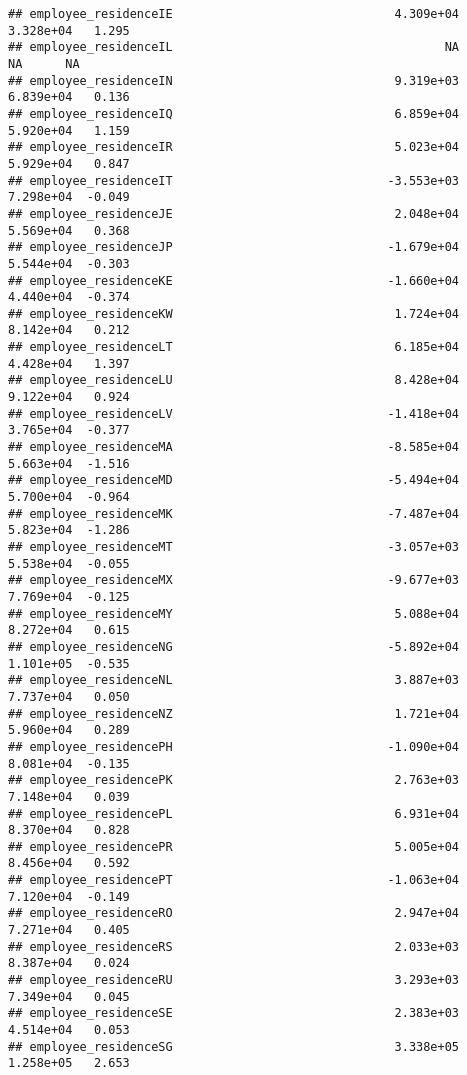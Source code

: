 \documentclass[
]{article}
\begin{document}
\begin{verbatim}
## employee_residenceIE                               4.309e+04  3.328e+04   1.295
## employee_residenceIL                                      NA         NA      NA
## employee_residenceIN                               9.319e+03  6.839e+04   0.136
## employee_residenceIQ                               6.859e+04  5.920e+04   1.159
## employee_residenceIR                               5.023e+04  5.929e+04   0.847
## employee_residenceIT                              -3.553e+03  7.298e+04  -0.049
## employee_residenceJE                               2.048e+04  5.569e+04   0.368
## employee_residenceJP                              -1.679e+04  5.544e+04  -0.303
## employee_residenceKE                              -1.660e+04  4.440e+04  -0.374
## employee_residenceKW                               1.724e+04  8.142e+04   0.212
## employee_residenceLT                               6.185e+04  4.428e+04   1.397
## employee_residenceLU                               8.428e+04  9.122e+04   0.924
## employee_residenceLV                              -1.418e+04  3.765e+04  -0.377
## employee_residenceMA                              -8.585e+04  5.663e+04  -1.516
## employee_residenceMD                              -5.494e+04  5.700e+04  -0.964
## employee_residenceMK                              -7.487e+04  5.823e+04  -1.286
## employee_residenceMT                              -3.057e+03  5.538e+04  -0.055
## employee_residenceMX                              -9.677e+03  7.769e+04  -0.125
## employee_residenceMY                               5.088e+04  8.272e+04   0.615
## employee_residenceNG                              -5.892e+04  1.101e+05  -0.535
## employee_residenceNL                               3.887e+03  7.737e+04   0.050
## employee_residenceNZ                               1.721e+04  5.960e+04   0.289
## employee_residencePH                              -1.090e+04  8.081e+04  -0.135
## employee_residencePK                               2.763e+03  7.148e+04   0.039
## employee_residencePL                               6.931e+04  8.370e+04   0.828
## employee_residencePR                               5.005e+04  8.456e+04   0.592
## employee_residencePT                              -1.063e+04  7.120e+04  -0.149
## employee_residenceRO                               2.947e+04  7.271e+04   0.405
## employee_residenceRS                               2.033e+03  8.387e+04   0.024
## employee_residenceRU                               3.293e+03  7.349e+04   0.045
## employee_residenceSE                               2.383e+03  4.514e+04   0.053
## employee_residenceSG                               3.338e+05  1.258e+05   2.653

\end{verbatim}
\end{document}
